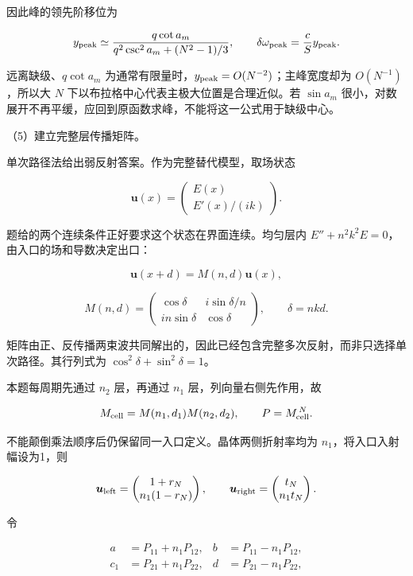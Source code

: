 \documentclass[12pt,a4paper,fontset=fandol]{ctexart}
\begin{document}
因此峰的领先阶移位为

\[
y_{\rm peak}\simeq
\frac{q\cot a_m}
{q^2\csc^2a_m+(N^2-1)/3},\qquad
\delta\omega_{\rm peak}=\frac cS y_{\rm peak}.
\]

远离缺级、\(q\cot a_m\)
为通常有限量时，\(y_{\rm peak}=O(N^{-2})\)；主峰宽度却为
\(O(N^{-1})\)，所以大 \(N\) 下以布拉格中心代表主极大位置是合理近似。若
\(\sin a_m\)
很小，对数展开不再平缓，应回到原函数求峰，不能将这一公式用于缺级中心。

（5）建立完整层传播矩阵。

单次路径法给出弱反射答案。作为完整替代模型，取场状态

\[
\boldsymbol u(x)=
\begin{pmatrix}E(x)\\E'(x)/(ik)\end{pmatrix}.
\]

题给的两个连续条件正好要求这个状态在界面连续。均匀层内
\(E''+n^2k^2E=0\)，由入口的场和导数决定出口：

\[
\boldsymbol u(x+d)=M(n,d)\boldsymbol u(x),
\]

\[
M(n,d)=
\begin{pmatrix}
\cos\delta&i\sin\delta/n\\
in\sin\delta&\cos\delta
\end{pmatrix},\qquad \delta=nkd.
\]

矩阵由正、反传播两束波共同解出的，因此已经包含完整多次反射，而非只选择单次路径。其行列式为
\(\cos^2\delta+\sin^2\delta=1\)。

本题每周期先通过 \(n_2\) 层，再通过 \(n_1\) 层，列向量右侧先作用，故

\[
M_{\rm cell}=M(n_1,d_1)M(n_2,d_2),\qquad
P=M_{\rm cell}^{\,N}.
\]

不能颠倒乘法顺序后仍保留同一入口定义。晶体两侧折射率均为
\(n_1\)，将入口入射幅设为1，则

\[
\boldsymbol u_{\rm left}
=\begin{pmatrix}1+r_N\\n_1(1-r_N)\end{pmatrix},\qquad
\boldsymbol u_{\rm right}
=\begin{pmatrix}t_N\\n_1t_N\end{pmatrix}.
\]

令

\[
\begin{aligned}
a&=P_{11}+n_1P_{12},& b&=P_{11}-n_1P_{12},\\
c_1&=P_{21}+n_1P_{22},& d&=P_{21}-n_1P_{22},
\end{aligned}
\]
\end{document}
